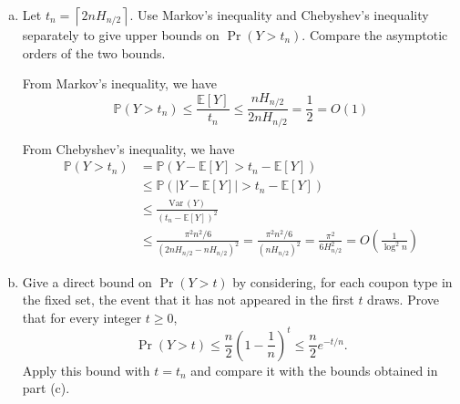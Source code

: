 \documentclass[12pt,letterpaper]{article}
\newcommand{\abs}[1]{\left\vert #1 \right\vert}
\renewcommand{\P}{\mathbb{P}}
\newcommand{\E}{\mathbb{E}}
\newcommand{\Var}{\text{Var}\,}
\begin{document}
\begin{enumerate}[a.]
    \color{darkblue}
        We showed above that $Y = \sum_{i=1}^{n/2} Y_i$ where $Y_i$ is a geometric random variable with success probability $\frac{n/2-i+1}{n}$. Therefore, we have
        \begin{align*}
            \Var(Y) &= \sum_{i=1}^{n/2} \Var(Y_i)\\ 
            &= \sum_{i=1}^{n/2} \frac{1 - \frac{n/2-i+1}{n}}{\left(\frac{n/2-i+1}{n}\right)^2}\\ 
            &= \sum_{i=1}^{n/2} \frac{n - (n/2-i+1)}{(n/2-i+1)^2} n\\
            &= \sum_{i=1}^{n/2} \frac{n/2+i-1}{(n/2-i+1)^2} n\\
            &\leq \sum_{i=1}^{n/2} \frac{n/2+n/2-1}{(n/2-i+1)^2} n\\
            &\leq \sum_{i=1}^{n/2} \frac{n}{(n/2-i+1)^2} n\\
            &= n^2 \sum_{j=1}^{n/2} \frac{1}{j^2} \leq n^2 \sum_{j=1}^{\infty} \frac{1}{j^2} = n^2 \frac{\pi^2}{6} = \frac{\pi^2 n^2}{6}
        \end{align*}
        where $j = n/2-i+1$.
        
    \color{black}


    \item Let $t_n=\left\lceil 2nH_{n/2}\right\rceil$. Use Markov's inequality and Chebyshev's inequality separately to give upper bounds on $\Pr(Y>t_n)$. Compare the asymptotic orders of the two bounds.
    
    \color{darkblue}
        From Markov's inequality, we have
        \[\P(Y > t_n) \leq \frac{\E[Y]}{t_n} \leq \frac{nH_{n/2}}{2nH_{n/2}} = \frac{1}{2} = O(1)\]

        From Chebyshev's inequality, we have
        \begin{align*}
            \P(Y > t_n) &= \P(Y - \E[Y] > t_n - \E[Y])\\ 
            &\leq \P(\abs{Y - \E[Y]} > t_n - \E[Y])\\ 
            &\leq \frac{\Var(Y)}{(t_n - \E[Y])^2}\\ 
            &\leq \frac{\pi^2 n^2 / 6}{(2nH_{n/2} - nH_{n/2})^2} = \frac{\pi^2 n^2 / 6}{(nH_{n/2})^2} = \frac{\pi^2}{6H_{n/2}^2} = O\left(\frac{1}{\log^2 n}\right)
        \end{align*}
        
    \color{black}


    \item Give a direct bound on $\Pr(Y>t)$ by considering, for each coupon type in the fixed set, the event that it has not appeared in the first $t$ draws. Prove that for every integer $t\geq 0$,
    \[
    \Pr(Y>t)\leq \frac{n}{2}\left(1-\frac{1}{n}\right)^t\leq \frac{n}{2}e^{-t/n}.
    \]
    Apply this bound with $t=t_n$ and compare it with the bounds obtained in part (c).



\end{enumerate}
\end{document}
